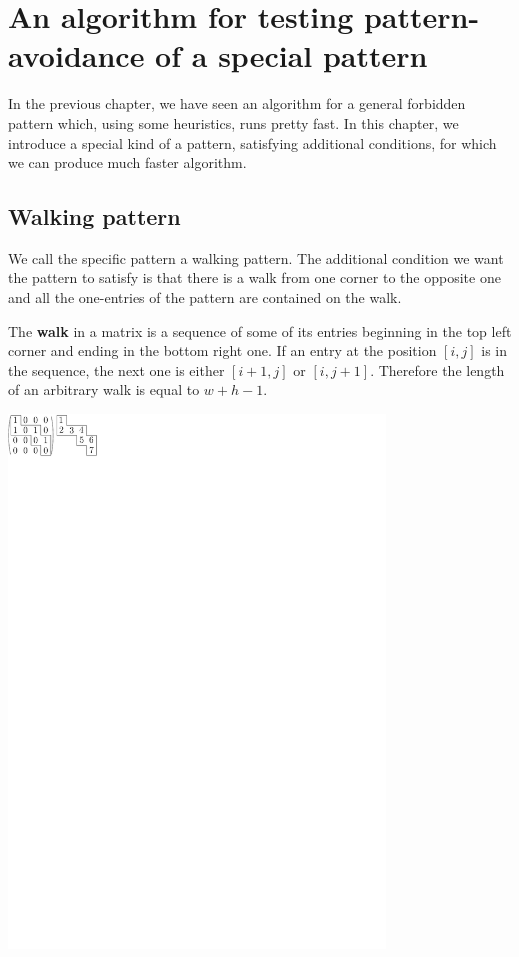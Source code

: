 \chapter{An algorithm for testing pattern-avoidance of a special pattern}
In the previous chapter, we have seen an algorithm for a general forbidden pattern which, using some heuristics, runs pretty fast. In this chapter, we introduce a special kind of a pattern, satisfying additional conditions, for which we can produce much faster algorithm.

\section{Walking pattern}
We call the specific pattern a walking pattern. The additional condition we want the pattern to satisfy is that there is a walk from one corner to the opposite one and all the one-entries of the pattern are contained on the walk.

The \textbf{walk} in a matrix is a sequence of some of its entries beginning in the top left corner and ending in the bottom right one. If an entry at the position $[i,j]$ is in the sequence, the next one is either $[i+1,j]$ or $[i,j+1]$. Therefore the length of an arbitrary walk is equal to $w+h-1$.

\centerline{\mbox{\includegraphics[width=100mm]{../img/walk.pdf}}}

